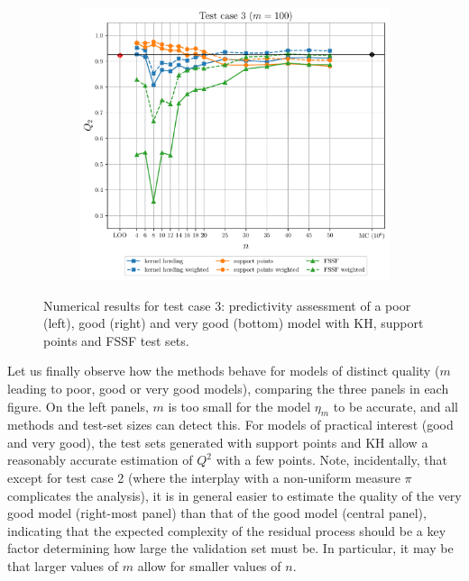 \begin{figure}
\begin{subfigure}[b]{0.49\linewidth}
  \end{subfigure}
  \\
  \centering
  \begin{subfigure}[b]{0.49\linewidth}
    \centering
    \includegraphics[width=\linewidth]{./part2/figures/SIS/gsobol_learnsize_100.pdf}
  \end{subfigure}
  \caption{Numerical results for test case 3: predictivity assessment of a poor (left), good (right) and very good (bottom) model with KH, support points and FSSF test sets.}
  \label{fig:gsobol_benchmark}
\end{figure}

Let us finally observe how the methods behave for models of distinct quality ($m$ leading to poor, good or very good models), comparing the three panels in each figure. 
On the left panels, $m$ is too small for the model $\eta_m$ to be accurate, and all methods and test-set sizes can detect this. 
For models of practical interest (good and very good), the test sets generated with support points and KH allow a reasonably accurate estimation of $Q^2$ with a few points. 
Note, incidentally, that except for test case 2 (where the interplay with a non-uniform measure $\pi$ complicates the analysis), it is in general easier to estimate the quality of the very good model (right-most panel) than that of the good model (central panel), indicating that the expected complexity of the residual process should be a key factor determining how large the validation set must be. 
In particular, it may be that larger values of $m$ allow for smaller values of $n$.





